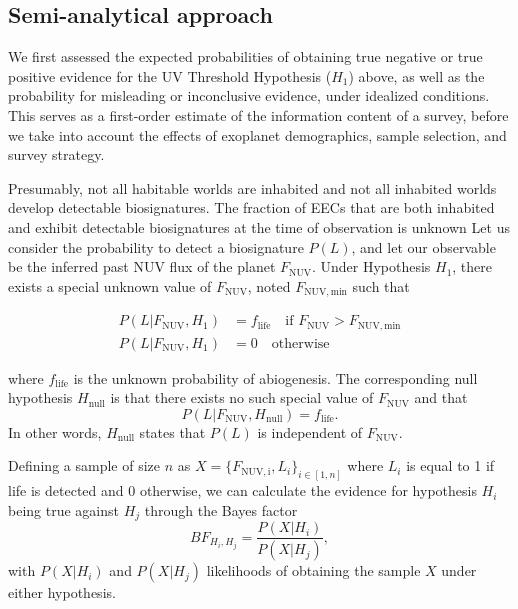 \documentclass[twocolumn,twocolappendix,linenumbers]{aastex631}
\begin{document}
\subsection{Semi-analytical approach}\label{sec:met-semianalytical}
We first assessed the expected probabilities of obtaining true negative or true positive evidence for the UV Threshold Hypothesis ($H_1$) above, as well as the probability for misleading or inconclusive evidence, under idealized conditions.
This serves as a first-order estimate of the information content of a survey, before we take into account the effects of exoplanet demographics, sample selection, and survey strategy.

Presumably, not all habitable worlds are inhabited and not all inhabited worlds develop detectable biosignatures.
The fraction of \glspl{EEC} that are both inhabited and exhibit detectable biosignatures at the time of observation is unknown 
Let us consider the probability to detect a biosignature $P(L)$, and let our observable be the inferred past \gls{NUV} flux of the planet $F_\mathrm{NUV}$.
Under Hypothesis $H_1$, there exists a special unknown value of $F_\mathrm{NUV}$, noted $F_\mathrm{NUV, min}$ such that

\begin{align}
    P(L|F_\mathrm{NUV},H_1) &=  f_\mathrm{life} \quad \text{if } F_\mathrm{NUV}>F_\mathrm{NUV, min}\\
    P(L|F_\mathrm{NUV},H_1) &=  0               \quad  \text{otherwise}
\end{align}

where $f_\mathrm{life}$ is the unknown probability of abiogenesis.
The corresponding null hypothesis $H_\mathrm{null}$ is that there exists no such special value of $F_\mathrm{NUV}$ and that
\begin{equation}
P(L|F_\mathrm{NUV},H_\mathrm{null}) = f_\mathrm{life}.
\end{equation}
In other words, $H_\mathrm{null}$ states that $P(L)$ is independent of $F_\mathrm{NUV}$.

Defining a sample of size $n$ as $X=\{F_\mathrm{NUV, i},L_i\}_{i \in [1,n]}$ where $L_i$ is equal to 1 if life is detected and 0 otherwise, we can calculate the evidence for hypothesis $H_i$ being true against $H_j$ through the Bayes factor
\begin{equation}
BF_{H_i,H_j} = \frac{P(X|H_i)}{P(X|H_j)},
\end{equation}
with $P(X|H_i)$ and $P(X|H_j)$ likelihoods of obtaining the sample $X$ under either hypothesis.
\end{document}
